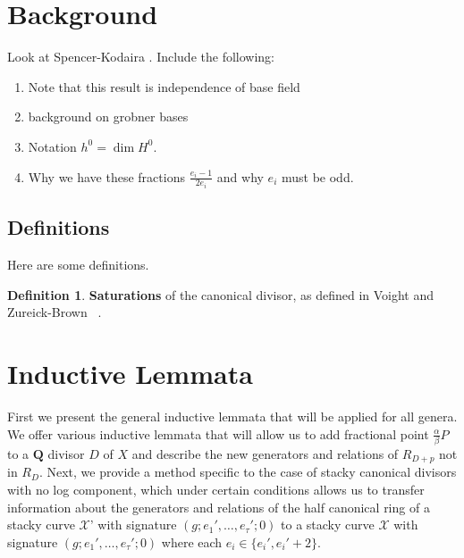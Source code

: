 \documentclass{amsart}
\theoremstyle{plain}
\theoremstyle{definition}
\newtheorem{defn}[thm]{Definition}
\theoremstyle{remark}
\numberwithin{equation}{section}
\newcommand \sx{\mathscr X}
\begin{document}


\section{Background}
\label{sec:background}
Look at Spencer-Kodaira \cite{kodaira:complex-manifolds}.
Include the following:
\begin{enumerate}
	\item Note that this result is independence of base field
	\item background on grobner bases
	\item Notation $h^0 = \dim H^0$.
	\item Why we have these fractions $\frac{e_i-1}{2e_i}$ and why $e_i$ must be odd.
\end{enumerate}

\subsection{Definitions}
Here are some definitions.

\begin{defn}
\label{defn:sat}
\textbf{Saturations} of the canonical divisor, as defined in Voight
and Zureick-Brown ~\cite[Section 7.2]{vzb:stacky}.
\end{defn}




\section{Inductive Lemmata}
\label{sec:induction}
First we present the general inductive lemmata that will be applied
for all genera.  We offer various inductive lemmata that will allow us to add fractional point $\frac{\alpha}{\beta}P$ to a $\mathbf{Q}$ divisor $D$ of $X$ and describe the new generators and relations of $R_{D+p}$ not in $R_D$.  Next, we provide a method specific to the case of stacky canonical divisors with no log component, which under certain conditions allows us to transfer information about the generators and relations of the half canonical ring of a stacky curve $\sx$' with signature $(g; e_1', \ldots, e_\tau'; 0)$ to a stacky curve $\sx$ with signature $(g; e_1', \ldots, e_\tau'; 0)$ where each $e_i\in \{e_i', e_i'+2\}$.    
\end{document}
